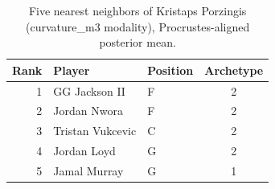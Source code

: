 \begin{table}[htbp]
  \centering\small
  \begin{tabular}{rllc}
    \toprule
    Rank & Player & Position & Archetype \\
    \midrule
    1 & GG Jackson II & F & 2 \\
    2 & Jordan Nwora & F & 2 \\
    3 & Tristan Vukcevic & C & 2 \\
    4 & Jordan Loyd & G & 2 \\
    5 & Jamal Murray & G & 1 \\
    \bottomrule
  \end{tabular}
  \caption{Five nearest neighbors of Kristaps Porzingis (curvature_m3 modality), Procrustes-aligned posterior mean.}
  \label{tab:Kristaps_Porzingis_neighbors_curvature_m3}
\end{table}


